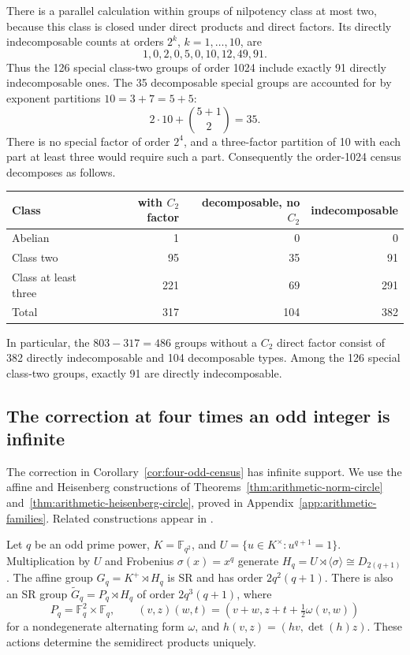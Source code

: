 \documentclass[11pt,a4paper]{amsart}
\theoremstyle{definition}
\theoremstyle{remark}
\numberwithin{equation}{section}
\begin{document}
There is a parallel calculation within groups of nilpotency class
at most two, because this class is closed under direct products and
direct factors. Its directly indecomposable counts at orders
$2^k$, $k=1,\ldots,10$, are
\[
 1,0,2,0,5,0,10,12,49,91.
\]
Thus the 126 special class-two groups of order 1024 include exactly
91 directly indecomposable ones. The 35 decomposable special groups
are accounted for by exponent partitions $10=3+7=5+5$:
\[
 2\cdot10+\binom{5+1}{2}=35.
\]
There is no special factor of order $2^4$, and a three-factor
partition of 10 with each part at least three would require such
a part. Consequently the order-1024 census decomposes as follows.
\begin{center}
\begin{tabular}{lrrr}
\toprule
Class&with $C_2$ factor&decomposable, no $C_2$&indecomposable\\\midrule
Abelian&1&0&0\\
Class two&95&35&91\\
Class at least three&221&69&291\\\midrule
Total&317&104&382\\\bottomrule
\end{tabular}
\end{center}
In particular, the $803-317=486$ groups without a $C_2$ direct
factor consist of 382 directly indecomposable and 104 decomposable
types. Among the 126 special class-two groups, exactly 91 are
directly indecomposable.

\subsection{The correction at four times an odd integer is infinite}
The correction in Corollary~\ref{cor:four-odd-census} has infinite
support. We use the affine and Heisenberg constructions of
Theorems~\ref{thm:arithmetic-norm-circle}
and~\ref{thm:arithmetic-heisenberg-circle}, proved in
Appendix~\ref{app:arithmetic-families}. Related constructions appear
in \cite[Chapter~XXVI, pp.~453--454]{BKZ19}.

Let $q$ be an odd prime power, $K=\mathbb F_{q^2}$, and
$U=\{u\in K^\times:u^{q+1}=1\}$. Multiplication by $U$ and
Frobenius $\sigma(x)=x^q$ generate
$H_q=U\rtimes\langle\sigma\rangle\cong D_{2(q+1)}$.
The affine group $G_q=K^+\rtimes H_q$ is SR and has order
$2q^2(q+1)$. There is also an SR group
$\widetilde G_q=P_q\rtimes H_q$ of order $2q^3(q+1)$, where
\[
 P_q=\mathbb F_q^2\times\mathbb F_q,\qquad
 (v,z)(w,t)=(v+w,z+t+\tfrac12\omega(v,w))
\]
for a nondegenerate alternating form $\omega$, and
$h(v,z)=(hv,\det(h)z)$. These actions determine the semidirect products uniquely.
\end{document}
